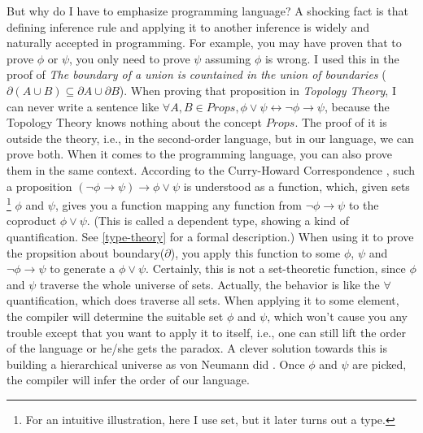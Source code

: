 \documentclass[12pt,a4paper]{report}
\begin{document}
But why do I have to emphasize programming language? A shocking fact is 
that defining inference rule and applying it to another inference is 
widely and naturally accepted in programming. For example, you may have
proven that to prove $\phi$ or $\psi$, you only need to prove $\psi$ 
assuming $\phi$ is wrong. I used this in the proof of 
{\it The boundary of a union is countained in the union of boundaries} 
($\partial(A\cup B)\subseteq \partial A \cup\partial B$). 
When proving that proposition in {\it Topology Theory}, I can never 
write a sentence like $\forall A,B\in Props,\phi\vee\psi \leftrightarrow
\neg\phi\rightarrow\psi$, because the Topology Theory knows nothing
about the concept $Props$. The proof of it is outside the theory,
i.e., in the second-order language, but in our language, we can
prove both. When it comes to the programming language, you can also
prove them in the same context. According to the Curry-Howard 
Correspondence \cite{Curry-Howard,Curry-Howard-Scheme}, such a
proposition $(\neg\phi\to\psi)\to\phi\vee\psi$ is understood as a 
function, which, given sets \footnote{For an intuitive illustration, 
here I use set, but it later turns out a type.} $\phi$ and $\psi$, 
gives you a function mapping any function from 
$\neg\phi\to\psi$ to the coproduct $\phi\vee\psi$. (This is 
called a dependent type, showing a kind of quantification. See 
\autoref{type-theory} for a formal description.) When using it to
prove the propsition about boundary($\partial$), you apply this
function to some $\phi$, $\psi$ and $\neg\phi\to\psi$ to generate
a $\phi\vee\psi$. Certainly, this is not a set-theoretic function,
since $\phi$ and $\psi$ traverse the whole universe of sets. Actually,
the behavior is like the $\forall$ quantification, which does traverse
all sets. When applying it to some element, the compiler will determine
the suitable set $\phi$ and $\psi$, which won't cause you any trouble
except that you want to apply it to itself, i.e., one can still lift
the order of the language or he/she gets the paradox. A clever solution 
towards this is building a hierarchical universe as von Neumann did 
\cite{von-Neumann-universe}. Once $\phi$ and $\psi$ are picked, the 
compiler will infer the order of our language. 
\end{document}
